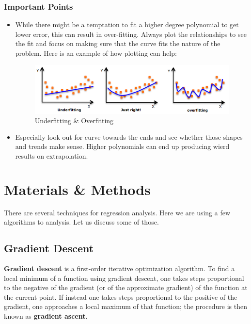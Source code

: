 \documentclass[11pt, a4paper]{report}
\begin{document}
\subsection{Important Points}

\begin{itemize}
	\item {While there might be a temptation to fit a higher degree polynomial to get lower error, this can result in over-fitting. Always plot the relationships to see the fit and focus on making sure that the curve fits the nature of the problem. Here is an example of how plotting can help: 
				\begin{figure}[!bth]
				\center
				\includegraphics[scale=0.6]{images/underfitting-overfitting.png}
				\caption[Underfitting \& Overfitting]{Underfitting \& Overfitting \cite{desc:RegressionAnalysis}}
				\label{fig:underfittingOverfitting}
			\end{figure}

	}
	\item Especially look out for curve towards the ends and see whether those shapes and trends make sense. Higher polynomials can end up producing wierd results on extrapolation. \cite{desc:RegressionAnalysis}
\end{itemize}


\newpage

\chapter{Materials \& Methods}
There are several techniques for regression analysis. Here we are using a few algorithms to analysis. Let us discuss some of those.

\section{Gradient Descent} \label{chap:GD}
\textbf{Gradient descent} is a first-order iterative optimization algorithm. To find a local minimum of a function using gradient descent, one takes steps proportional to the negative of the gradient (or of the approximate gradient) of the function at the current point. If instead one takes steps proportional to the positive of the gradient, one approaches a local maximum of that function; the procedure is then known as \textbf{gradient ascent}.
\end{document}
